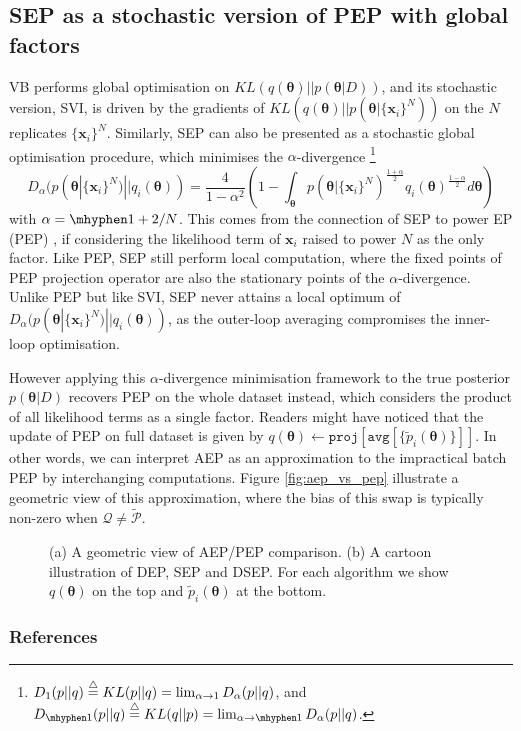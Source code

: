 \documentclass{article} %
\begin{document}
\subsection{SEP as a stochastic version of PEP with global factors}
VB performs global optimisation on $KL(q(\bm{\theta})||p(\bm{\theta}|D))$, and its stochastic version, SVI, is driven by the gradients of $KL(q(\bm{\theta}) || p(\bm{\theta} | \{\bm{x}_i\}^N))$ on the $N$ replicates $\{\bm{x}_i\}^N$. Similarly, SEP can also be presented as a stochastic global optimisation procedure, which minimises the $\alpha$-divergence \footnote{$D_{1}(p||q) \buildrel\triangle\over = KL(p || q) = \lim_{\alpha \rightarrow 1} D_{\alpha}(p||q)$, and $D_{ \mhyphen 1}(p||q) \buildrel\triangle\over = KL(q || p) = \lim_{\alpha \rightarrow \mhyphen 1} D_{\alpha}(p || q)$. } \cite{amari:ig1985}
\begin{equation}
D_{\alpha}(p(\bm{\theta} | \{\bm{x}_i\}^N) || q_i(\bm{\theta})) = \frac{4}{1 - \alpha^2} 
		\left( 1 - \int_{\bm{\theta}} p(\bm{\theta} | \{\bm{x}_i\}^N)^{\frac{1+\alpha}{2}} q_i(\bm{\theta})^{\frac{1-\alpha}{2}} d\bm{\theta} \right)
\end{equation} 
with $\alpha = \mhyphen 1 + 2/N$. This comes from the connection of SEP to power EP (PEP) \cite{minka:powerep}, if considering the likelihood term of $\bm{x}_i$ raised to power $N$ as the only factor. Like PEP, SEP still perform local computation, where the fixed points of PEP projection operator are also the stationary points of the $\alpha$-divergence. Unlike PEP but like SVI, SEP never attains a local optimum of $D_{\alpha}(p(\bm{\theta} | \{\bm{x}_i\}^N) || q_i(\bm{\theta}))$, as the outer-loop averaging compromises the inner-loop optimisation.

%
However applying this $\alpha$-divergence minimisation framework to the true posterior $p(\bm{\theta}|D)$ recovers PEP on the whole dataset instead, which considers the product of all likelihood terms as a single factor. Readers might have noticed that the update of PEP on full dataset is given by $q(\bm{\theta}) \leftarrow \mathtt{proj}[\mathtt{avg}[\{ \tilde{p}_i(\bm{\theta}) \}]]$. In other words, we can interpret AEP as an approximation to the impractical batch PEP by interchanging computations. Figure \ref{fig:aep_vs_pep} illustrate a geometric view of this approximation, where the bias of this swap is typically non-zero when $\mathcal{Q} \neq \tilde{\mathcal{P}}$.

%
\begin{figure}
\centering
\def\svgwidth{0.3\linewidth}
\subfigure[\label{fig:aep_vs_pep}]{
}
%
\hspace{0.5in}
%
\def\svgwidth{0.35\linewidth}
\subfigure[\label{fig:dep_sep_dsep}]{
}

\caption{(a) A geometric view of AEP/PEP comparison. (b) A cartoon illustration of DEP, SEP and DSEP. For each algorithm we show $q(\bm{\theta})$ on the top and $\tilde{p}_i(\bm{\theta})$ at the bottom. }

\end{figure}
\subsubsection*{References}
\renewcommand{\section}[2]{}


\end{document}
